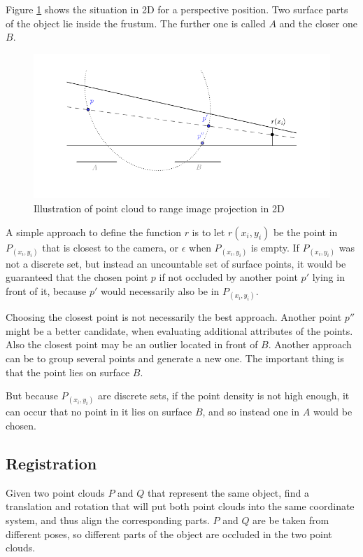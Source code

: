 Figure \ref{fig:pp_projection} shows the situation in 2D for a perspective position. Two surface parts of the object lie inside the frustum. The further one is called $A$ and the closer one $B$.

\begin{figure}[h]
\center
\includegraphics[width=.8\textwidth]{fig/pp_projection.pdf}
\caption{Illustration of point cloud to range image projection in 2D}
\label{fig:pp_projection}
\end{figure}

A simple approach to define the function $r$ is to let $r(x_i, y_i)$ be the point in $P_{(x_i,y_i)}$ that is closest to the camera, or $\epsilon$ when $P_{(x_i,y_i)}$ is empty. If $P_{(x_i,y_i)}$ was not a discrete set, but instead an uncountable set of surface points, it would be guaranteed that the chosen point $p$ if not occluded by another point $p'$ lying in front of it, because $p'$ would necessarily also be in $P_{(x_i,y_i)}$.

Choosing the closest point is not necessarily the best approach. Another point $p''$ might be a better candidate, when evaluating additional attributes of the points. Also the closest point may be an outlier located in front of $B$. Another approach can be to group several points and generate a new one. The important thing is that the point lies on surface $B$.

But because $P_{(x_i,y_i)}$ are discrete sets, if the point density is not high enough, it can occur that no point in it lies on surface $B$, and so instead one in $A$ would be chosen.



\subsection{Registration} \label{sec:pc_registration}
Given two point clouds $P$ and $Q$ that represent the same object, find a translation and rotation that will put both point clouds into the same coordinate system, and thus align the corresponding parts. $P$ and $Q$ are be taken from different poses, so different parts of the object are occluded in the two point clouds.

